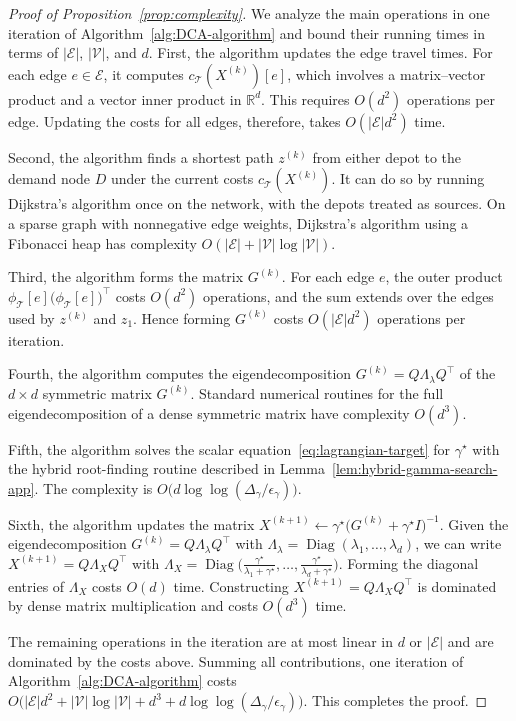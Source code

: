 \documentclass[11pt, letterpaper, oneside, reqno]{amsart}
\DeclareMathOperator{\Diag}{Diag}
\newcommand{\opt}{^\star}
\begin{document}
\begin{proof}[Proof of Proposition~\ref{prop:complexity}]
We analyze the main operations in one iteration of Algorithm~\ref{alg:DCA-algorithm} and bound their running times in terms of $|\mathcal E|$, $|\mathcal V|$, and $d$. First, the algorithm updates the edge travel times. For each edge $e \in \mathcal E$, it computes $c_{\mathcal T}(X^{(k)})[e]$, which involves a matrix--vector product and a vector inner product in $\mathbb R^d$. This requires $O(d^2)$ operations per edge. Updating the costs for all edges, therefore, takes $O(|\mathcal E| d^2)$ time.

Second, the algorithm finds a shortest path $z^{(k)}$ from either depot to the demand node $D$ under the current costs $c_{\mathcal T}(X^{(k)})$. It can do so by running Dijkstra's algorithm once on the network, with the depots treated as sources. On a sparse graph with nonnegative edge weights, Dijkstra's algorithm using a Fibonacci heap has complexity $O(|\mathcal E| + |\mathcal V| \log |\mathcal V|)$.

Third, the algorithm forms the matrix $G^{(k)}$. 
For each edge $e$, the outer product $\phi_{\mathcal T}[e]\bigl(\phi_{\mathcal T}[e]\bigr)^\top$ costs $O(d^2)$ operations, and the sum extends over the edges used by $z^{(k)}$ and $z_1$. Hence forming $G^{(k)}$ costs $O(|\mathcal E| d^2)$ operations per iteration.

Fourth, the algorithm computes the eigendecomposition $G^{(k)} = Q \Lambda_\lambda Q^\top$ of the $d \times d$ symmetric matrix $G^{(k)}$. Standard numerical routines for the full eigendecomposition of a dense symmetric matrix have complexity $O(d^3)$.

Fifth, the algorithm solves the scalar equation~\eqref{eq:lagrangian-target} for $\gamma\opt$ with the hybrid root-finding routine described in Lemma~\ref{lem:hybrid-gamma-search-app}. The complexity is $O\bigl(d \log\log(\Delta_\gamma/\epsilon_\gamma)\bigr)$.

Sixth, the algorithm updates the matrix $X^{(k+1)}\gets\gamma^\star\bigl(G^{(k)}+\gamma^\star I\bigr)^{-1}$.
Given the eigendecomposition $G^{(k)}=Q\Lambda_\lambda Q^\top$ with $\Lambda_\lambda=\Diag(\lambda_1,\ldots,\lambda_d)$, we can write
$X^{(k+1)} = Q\Lambda_XQ^\top$ with 
$\Lambda_X = \Diag\bigl(\frac{\gamma^\star}{\lambda_1+\gamma^\star}, \ldots, \frac{\gamma^\star}{\lambda_d+\gamma^\star} \bigr)$.
Forming the diagonal entries of $\Lambda_X$ costs $O(d)$ time. 
Constructing $X^{(k+1)}=Q\Lambda_XQ^\top$ is dominated by dense matrix
multiplication and costs $O(d^3)$ time.

The remaining operations in the iteration are at most linear in $d$ or $|\mathcal E|$ and are dominated by the costs above. Summing all contributions, one iteration of Algorithm~\ref{alg:DCA-algorithm} costs
$O\bigl(|\mathcal E| d^2 + |\mathcal V| \log |\mathcal V| + d^3 + d \log\log(\Delta_\gamma/\epsilon_\gamma)\bigr)$.
This completes the proof.
\end{proof}
\end{document}
